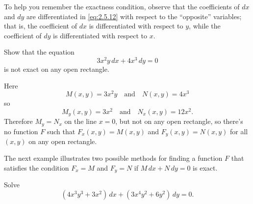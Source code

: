 To help you  remember the exactness condition, observe
that the coefficients of $dx$ and $dy$ are differentiated in
\eqref{eq:2.5.12} with respect to the ``opposite'' variables; that is,
the coefficient of $dx$ is differentiated with respect to $y$, while the
coefficient of $dy$ is differentiated with respect to $x$.

\begin{example}\label{example:2.5.2}
 Show that the equation
\[
3x^2y\,dx+4x^3\,dy=0
\]
is not exact on any open rectangle.
\end{example}

\begin{solution}
Here
\[
M(x,y)=3x^2y\quad\text{and}\quad  N(x,y)=4x^3
\]
so
\[
M_y(x,y)=3x^2 \quad\text{and}\quad  N_x(x,y)=12 x^2.
\]
Therefore  $M_y=N_x$   on the line $x=0$,
but not on any open rectangle, so
there's no
function $F$ such that $F_x(x,y)=M(x,y)$ and $F_y(x,y)=N(x,y)$
for all $(x,y)$ on any open rectangle.
\end{solution}

The next example illustrates two possible methods for finding a
function $F$ that satisfies the condition $F_x=M$ and $F_y=N$ if
$M\,dx+N\,dy=0 $ is exact.

\begin{example}\label{example:2.5.3}
Solve
\begin{equation}\label{eq:2.5.13}
(4x^3y^3+3x^2)\,dx+(3x^4y^2+6y^2)\,dy=0.
\end{equation}
\end{example}


